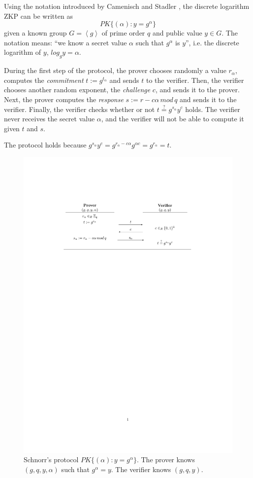 Using the notation introduced by Camenisch and Stadler \cite{camenisch1997efficient}, the discrete logarithm ZKP can be written as 
\[ PK\{ (\alpha) : y = g^\alpha \}  \]
given a known group $G=\left\langle g \right\rangle $ of prime order $q$ and public value $y\in G$. The notation means: ``we know a secret value $\alpha$ such that $g^\alpha$ is $y$'', i.e. the discrete logarithm of $y$, $log_g y = \alpha$.


During the first step of the protocol, the prover chooses randomly a value $r_\alpha$, computes the \textit{commitment} $t := g^{t_\alpha}$ and sends $t$ to the verifier. 
Then, the verifier chooses another random exponent, the \textit{challenge} $c$, and sends it to the prover. 
Next, the prover computes the \textit{response} $s:=r-c\alpha\, mod\, q$ and sends it to the verifier.
Finally, the verifier checks whether or not $ t \overset{?}{=} g^{s_\alpha} y^c $ holds. The verifier never receives the secret value $\alpha$, and the verifier will not be able to compute it given $t$ and $s$.

The protocol holds because $ g^{s_\alpha} y^c  =  g^{r_\alpha - c\alpha} g^{\alpha c} = g^{r_\alpha} = t $.

\begin{figure}[bth]
	\includegraphics[width=\linewidth]{gfx/schnorr}
	\caption{Schnorr's protocol $PK\{ (\alpha) : y = g^\alpha \}$. The prover knows $(g,q,y,\alpha)$ such that $g^\alpha=y$. The verifier knows $(g,q,y)$.}
	\label{fig:schnorr}
\end{figure}

